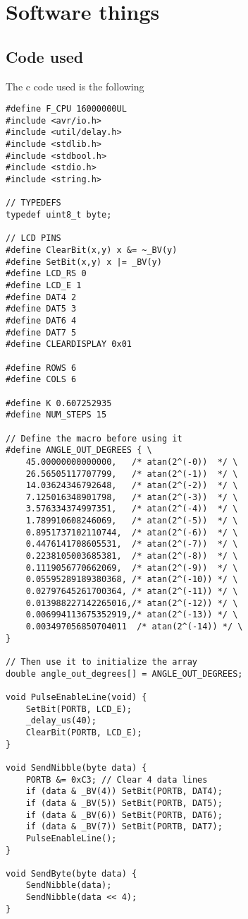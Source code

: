 \documentclass{article}
\begin{document}
\section{Software things}
\subsection{Code used}
The c code used is the following
\begin{verbatim}
#define F_CPU 16000000UL
#include <avr/io.h>
#include <util/delay.h>
#include <stdlib.h>
#include <stdbool.h>
#include <stdio.h>
#include <string.h>

// TYPEDEFS
typedef uint8_t byte;

// LCD PINS
#define ClearBit(x,y) x &= ~_BV(y)
#define SetBit(x,y) x |= _BV(y)
#define LCD_RS 0
#define LCD_E 1
#define DAT4 2
#define DAT5 3
#define DAT6 4
#define DAT7 5
#define CLEARDISPLAY 0x01

#define ROWS 6
#define COLS 6

#define K 0.607252935
#define NUM_STEPS 15

// Define the macro before using it
#define ANGLE_OUT_DEGREES { \
    45.00000000000000,   /* atan(2^(-0))  */ \
    26.56505117707799,   /* atan(2^(-1))  */ \
    14.03624346792648,   /* atan(2^(-2))  */ \
    7.125016348901798,   /* atan(2^(-3))  */ \
    3.576334374997351,   /* atan(2^(-4))  */ \
    1.789910608246069,   /* atan(2^(-5))  */ \
    0.8951737102110744,  /* atan(2^(-6))  */ \
    0.4476141708605531,  /* atan(2^(-7))  */ \
    0.2238105003685381,  /* atan(2^(-8))  */ \
    0.1119056770662069,  /* atan(2^(-9))  */ \
    0.05595289189380368, /* atan(2^(-10)) */ \
    0.02797645261700364, /* atan(2^(-11)) */ \
    0.013988227142265016,/* atan(2^(-12)) */ \
    0.006994113675352919,/* atan(2^(-13)) */ \
    0.003497056850704011  /* atan(2^(-14)) */ \
}

// Then use it to initialize the array
double angle_out_degrees[] = ANGLE_OUT_DEGREES;

void PulseEnableLine(void) {
    SetBit(PORTB, LCD_E);
    _delay_us(40);
    ClearBit(PORTB, LCD_E);
}

void SendNibble(byte data) {
    PORTB &= 0xC3; // Clear 4 data lines
    if (data & _BV(4)) SetBit(PORTB, DAT4);
    if (data & _BV(5)) SetBit(PORTB, DAT5);
    if (data & _BV(6)) SetBit(PORTB, DAT6);
    if (data & _BV(7)) SetBit(PORTB, DAT7);
    PulseEnableLine();
}

void SendByte(byte data) {
    SendNibble(data);
    SendNibble(data << 4);
}


\end{verbatim}
\end{document}
